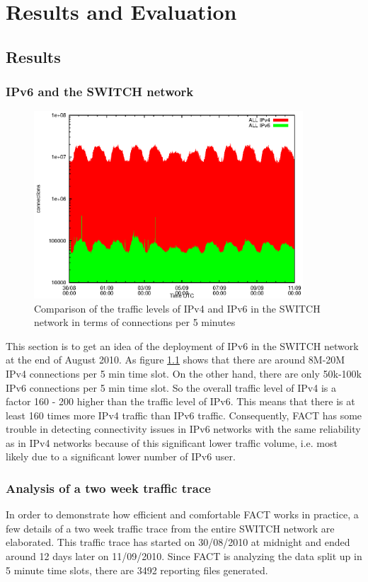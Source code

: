 

\chapter{Results and Evaluation\label{Results}}

\section{Results}
\subsection{IPv6 and the SWITCH network\label{RES_IPV6}}
\begin{figure}[hb!]
	\centering
	\includegraphics[height=70mm]{images/overview_v4v6}
	\caption{Comparison of the traffic levels of IPv4 and IPv6 in the SWITCH network in terms of connections per 5 minutes}
	\label{fig:ipv6_switch}
\end{figure}
This section is to get an idea of the deployment of IPv6 in the SWITCH network at the end of August 2010. As figure \ref{fig:ipv6_switch} shows that there are around 8M-20M IPv4 connections per 5 min time slot. On the other hand, there are only 50k-100k IPv6 connections per 5 min time slot. So the overall traffic level of IPv4 is a factor 160 - 200 higher than the traffic level of IPv6. This means that there is at least 160 times more IPv4 traffic than IPv6 traffic. Consequently, FACT has some trouble in detecting connectivity issues in IPv6 networks with the same reliability as in IPv4 networks because of this significant lower traffic volume, i.e. most likely due to a significant lower number of IPv6 user.

\subsection{Analysis of a two week traffic trace}
In order to demonstrate how efficient and comfortable FACT works in practice, a few details of a two week traffic trace from the entire SWITCH network are elaborated. This traffic trace has started on 30/08/2010 at midnight and ended around 12 days later on 11/09/2010. Since FACT is analyzing the data split up in 5 minute time slots, there are 3492 reporting files generated.

